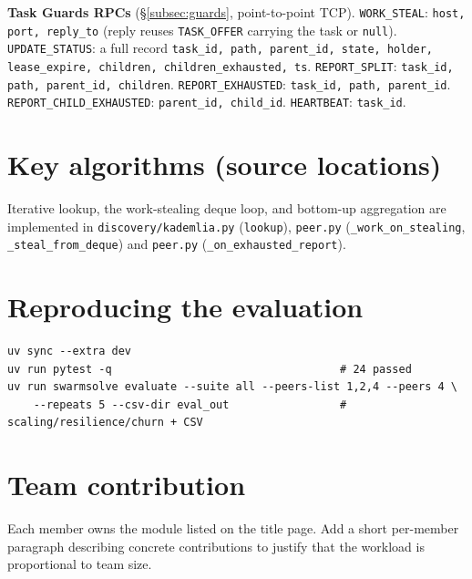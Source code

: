 \documentclass[11pt,a4paper]{article}
\newcommand{\code}[1]{\texttt{#1}}
\begin{document}
\textbf{Task Guards RPCs} (\S\ref{subsec:guards}, point-to-point TCP).
\code{WORK\_STEAL}: \code{host, port, reply\_to} (reply reuses \code{TASK\_OFFER} carrying the
task or \code{null}). \code{UPDATE\_STATUS}: a full record \code{task\_id, path, parent\_id,
state, holder, lease\_expire, children, children\_exhausted, ts}. \code{REPORT\_SPLIT}:
\code{task\_id, path, parent\_id, children}. \code{REPORT\_EXHAUSTED}: \code{task\_id, path,
parent\_id}. \code{REPORT\_CHILD\_EXHAUSTED}: \code{parent\_id, child\_id}. \code{HEARTBEAT}:
\code{task\_id}.

\section{Key algorithms (source locations)}
Iterative lookup, the work-stealing deque loop, and bottom-up aggregation are implemented in
\code{discovery/kademlia.py} (\code{lookup}), \code{peer.py} (\code{\_work\_on\_stealing},
\code{\_steal\_from\_deque}) and \code{peer.py} (\code{\_on\_exhausted\_report}).

\section{Reproducing the evaluation}
\begin{verbatim}
uv sync --extra dev
uv run pytest -q                                   # 24 passed
uv run swarmsolve evaluate --suite all --peers-list 1,2,4 --peers 4 \
    --repeats 5 --csv-dir eval_out                 # scaling/resilience/churn + CSV
\end{verbatim}

\section{Team contribution}
Each member owns the module listed on the title page. Add a short per-member paragraph describing
concrete contributions to justify that the workload is proportional to team size.
\end{document}
